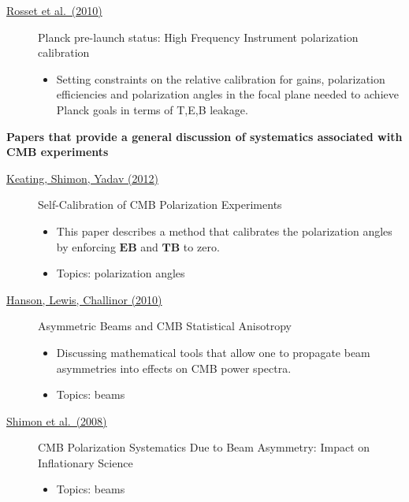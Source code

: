 \begin{description}
\item[\href{https://arxiv.org/abs/1004.2595}{Rosset et al.\ (2010)}] Planck pre-launch status: High Frequency Instrument polarization calibration
\begin{itemize}[noitemsep]
\item Setting constraints on the relative calibration for gains, polarization efficiencies and polarization angles in the focal plane needed to achieve Planck goals in terms of T,E,B leakage.
\end{itemize}



\end{description}

\noindent \textbf{Papers that provide a general discussion of systematics associated with CMB experiments}
\begin{description}

\item[\href{https://arxiv.org/abs/1211.5734}{Keating, Shimon, Yadav (2012)}] Self-Calibration of CMB Polarization Experiments
\begin{itemize}[noitemsep]
\item This paper describes a method that calibrates the polarization angles by enforcing $\mathbf{EB}$ and $\mathbf{TB}$ to zero.
\item Topics: polarization angles
\end{itemize}

\item[\href{https://arxiv.org/abs/1003.0198}{Hanson, Lewis, Challinor (2010)}] Asymmetric Beams and CMB Statistical Anisotropy
\begin{itemize}[noitemsep]
\item Discussing mathematical tools that allow one to propagate beam asymmetries into effects on CMB power spectra.
\item Topics: beams
\end{itemize}

\item[\href{https://arxiv.org/abs/0709.1513v4}{Shimon et al.\ (2008)}] CMB Polarization Systematics Due to Beam Asymmetry: Impact on Inflationary Science
\begin{itemize}[noitemsep]
\item Topics: beams
\end{itemize}

\end{description}
